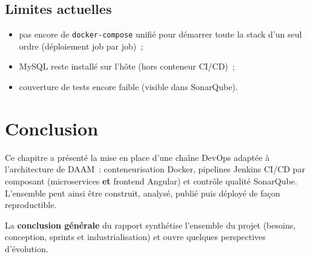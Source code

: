 \subsection{Limites actuelles}
\begin{itemize}
  \item pas encore de \texttt{docker-compose} unifié pour démarrer
        toute la stack d'un seul ordre (déploiement job par job)~;
  \item MySQL reste installé sur l'hôte (hors conteneur CI/CD)~;
  \item couverture de tests encore faible (visible dans SonarQube).
\end{itemize}


\section{Conclusion}

Ce chapitre a présenté la mise en place d'une chaîne DevOps adaptée à
l'architecture de DAAM~: conteneurisation Docker, pipelines Jenkins CI/CD
par composant (microservices \textbf{et} frontend Angular) et contrôle
qualité SonarQube. L'ensemble peut ainsi être construit, analysé, publié
puis déployé de façon reproductible.

La \textbf{conclusion générale} du rapport synthétise l'ensemble du
projet (besoins, conception, sprints et industrialisation) et ouvre
quelques perspectives d'évolution.

\clearpage
